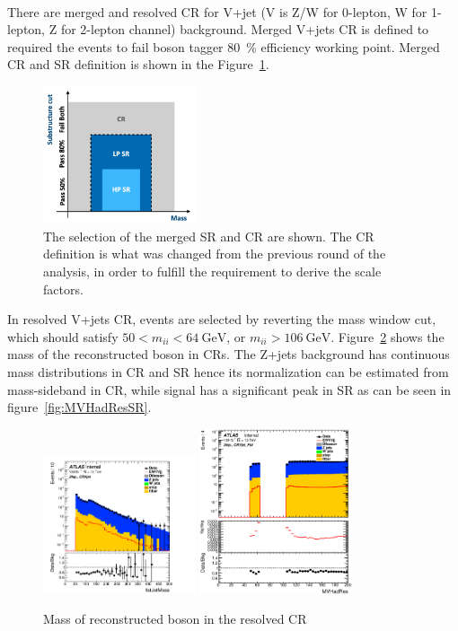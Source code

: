 \noindent\textbf{}  \\
There are merged and resolved CR for V+jet (V is Z/W for 0-lepton, W for 1-lepton, Z for 2-lepton channel) background.
Merged V+jets CR is defined to required the events to fail boson tagger 80~\% efficiency working point. 
Merged CR and SR definition is shown in the Figure~\ref{fig:MergedRegion}.
\begin{figure}[H]
    \centering
    \includegraphics[width=0.4\textwidth]{figures/MergedRegion}
    \caption{The selection of the merged SR and CR are shown. The CR definition is what was changed from the previous round of the analysis, in order to fulfill the requirement to derive the scale factors.}
    \label{fig:MergedRegion}
\end{figure}

In resolved V+jets CR, events are selected by reverting the mass window cut, which should satisfy $50<m_{i i}<64 ~\mathrm{GeV}$, or $m_{i i}>106 ~\mathrm{GeV}$. 
Figure~\ref{fig:CRVjet} shows the mass of the reconstructed boson in CRs. The Z+jets background has continuous mass distributions in CR and SR hence its normalization can be estimated from mass-sideband in CR, while signal has a significant peak in SR as can be seen in figure~\ref{fig:MVHadResSR}.

\begin{figure}[H]
    \centering
    \includegraphics[width=0.4\textwidth]{figures/2lep/dataMC/C_0ptag1pfat0pjet_0ptv_CRVjet_fatJetMass_Log}
    \includegraphics[width=0.4\textwidth]{figures/2lep/dataMC/C_0ptag2pjet_0ptv_CRVjet_Fid_MVHadRes_Log}
    \caption{Mass of reconstructed boson in the resolved CR}
    \label{fig:CRVjet}
\end{figure}

